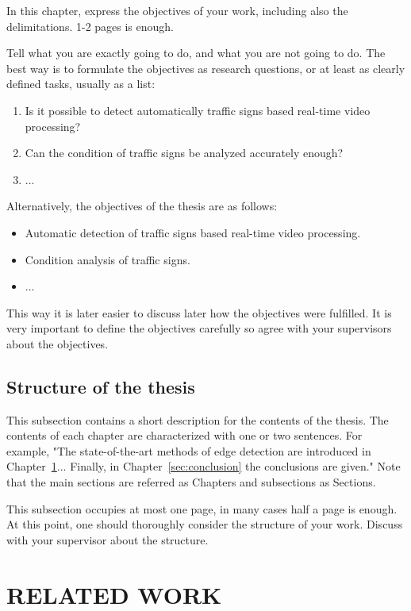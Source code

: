 \documentclass{lutmscthesis}[2017/10/03]
\begin{document}
In this chapter, express the objectives of your work, including also the delimitations. 1-2 pages is enough. 

Tell what you are exactly going to do, and what you are not going to do. The best way is to formulate the objectives as research questions, or at least as clearly defined tasks, usually as a list: 
\begin{enumerate}
\item Is it possible to detect automatically traffic signs based real-time video processing? 
\item Can the condition of traffic signs be analyzed accurately enough? 
\item ...
\end{enumerate}

Alternatively, the objectives of the thesis are as follows:
\begin{itemize}
\item Automatic detection of traffic signs based real-time video processing. 
\item Condition analysis of traffic signs.  
\item ...
\end{itemize}

This way it is later easier to discuss later how the objectives were fulfilled. It is very important to define the objectives carefully so agree with your supervisors about the objectives.  

\subsection{Structure of the thesis}

This subsection contains a short description for the contents of the thesis. 
The contents of each chapter are characterized with one or two sentences. 
For example, "The state-of-the-art methods of edge detection are introduced in Chapter~\ref{sec:related}... Finally, in Chapter~\ref{sec:conclusion} the conclusions are given." 
Note that the main sections are referred as Chapters and subsections as Sections.

This subsection occupies at most one page, in many cases half a page is enough. At this point, one should thoroughly consider the structure of your work. Discuss with your supervisor about the structure.  

\section{RELATED WORK}
\label{sec:related}
\end{document}
